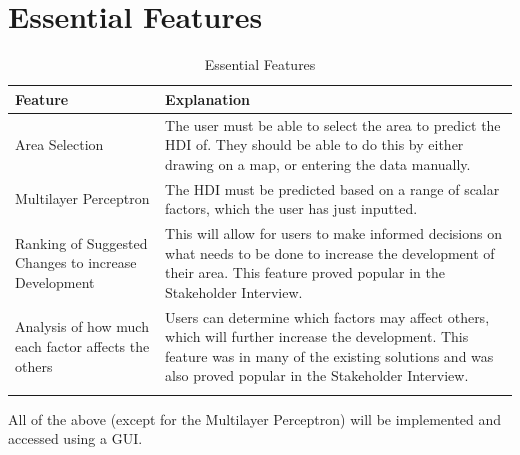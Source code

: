 \documentclass[12pt]{report}
\begin{document}
\section{Essential Features}
\begin{center}
\begin{longtable}{ | m{4cm} | m{11cm}| } 
    \hline
    \textbf{Feature} & \textbf{Explanation} \\ 
    \hline
    Area Selection & The user must be able to select the area to predict the HDI of. They should be able to do this by either drawing on a map, or entering the data manually. \\
    \hline
    Multilayer Perceptron & The HDI must be predicted based on a range of scalar factors, which the user has just inputted. \\
    \hline
    Ranking of Suggested Changes to increase Development & This will allow for users to make informed decisions on what needs to be done to increase the development of their area. This feature proved popular in the Stakeholder Interview. \\
    \hline
    Analysis of how much each factor affects the others & Users can determine which factors may affect others, which will further increase the development. This feature was in many of the existing solutions and was also proved popular in the Stakeholder Interview. \\
    \hline
\caption{Essential Features}
\end{longtable}
\end{center}
All of the above (except for the Multilayer Perceptron) will be implemented and accessed using a GUI.
\end{document}
